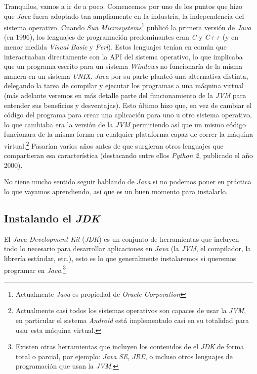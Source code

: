     Tranquilos, vamos a ir de a poco.
    Comencemos por uno de los puntos que hizo que \textit{Java} fuera adoptado tan ampliamente en la
    industria, la independencia del sistema operativo.
    Cuando \textit{Sun Microsystems}\footnote{Actualmente \textit{Java} es propiedad de 
    \textit{Oracle Corporation}} publicó la primera versión de \textit{Java} (en 1996), los 
    lenguajes de programación predominantes eran \textit{C} y \textit{C++} (y en menor medida 
    \textit{Visual Basic} y \textit{Perl}).
    Estos lenguajes tenían en común que interactuaban directamente con la API del sistema operativo,
    lo que implicaba que un programa escrito para un sistema \textit{Windows} no funcionaría de la
    misma manera en un sistema \textit{UNIX}.
    \textit{Java} por su parte planteó una alternativa distinta, delegando la tarea de compilar y 
    ejecutar los programas a una máquina virtual (más adelante veremos en más detalle parte del 
    funcionamiento de la \textit{JVM} para entender sus beneficios y desventajas).
    Esto último hizo que, en vez de cambiar el código del programa para crear una aplicación para 
    uno u otro sistema operativo, lo que cambiaba era la versión de la \textit{JVM} permitiendo así
    que un mismo código funcionara de la misma forma en cualquier plataforma capaz de correr la 
    máquina virtual.\footnote{Actualmente casi todos los sistemas operativos son capaces de usar la 
    \textit{JVM}, en particular el sistema \textit{Android} está implementado casi en su totalidad 
    para usar esta máquina virtual.}
    Pasarían varios años antes de que surgieran otros lenguajes que compartieran esa característica
    (destacando entre ellos \textit{Python 2}, publicado el año 2000).

    No tiene mucho sentido seguir hablando de \textit{Java} si no podemos poner en práctica lo que 
    vayamos aprendiendo, así que es un buen momento para instalarlo.

    \subsection{Instalando el \textit{JDK}}
      El \textit{Java Development Kit} (\textit{JDK}) es un conjunto de herramientas que incluyen 
      todo lo necesario para desarrollar aplicaciones en \textit{Java} (la \textit{JVM}, el 
      compilador, la librería estándar, etc.), esto es lo que generalmente instalaremos si queremos
      programar en \textit{Java}.\footnote{Existen otras herramientas que incluyen los contenidos de 
      el \textit{JDK} de forma total o parcial, por ejemplo: \textit{Java SE}, \textit{JRE}, o 
      incluso otros lenguajes de programación que usan la \textit{JVM}.}

